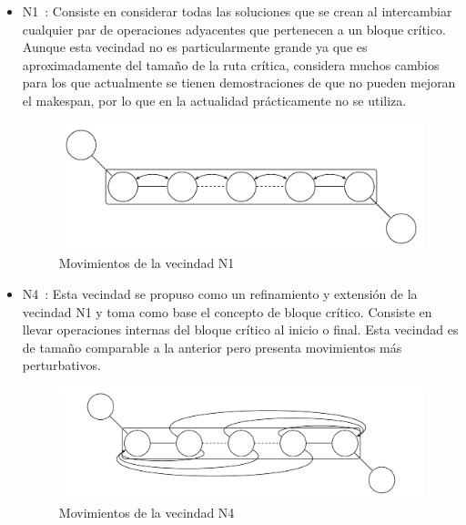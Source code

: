 \begin{itemize}
\item N1~\cite{blazewicz1996job}: Consiste en considerar todas las soluciones que se crean al intercambiar cualquier par de operaciones adyacentes que pertenecen 
a un bloque crítico. Aunque esta vecindad no es particularmente grande ya que es aproximadamente del tamaño de la ruta crítica, considera muchos cambios para los que 
actualmente se tienen demostraciones de que no pueden mejoran el makespan, por lo que en la actualidad prácticamente no se utiliza.
\begin{figure}[H]
\centering
\includegraphics[scale=.7]{Imagenes/N1.pdf}
\caption{Movimientos de la vecindad N1}
\end{figure}

\item N4~\cite{dell1993applying}: Esta vecindad se propuso como un refinamiento y extensión de la vecindad N1 y toma como base el concepto de bloque crítico. 
%
Consiste en llevar operaciones internas del bloque crítico al inicio o final. 
%
Esta vecindad es de tamaño comparable a la anterior pero presenta movimientos más perturbativos.
\begin{figure}[H]
\centering
\includegraphics[scale=.7]{Imagenes/N4.pdf}
\caption{Movimientos de la vecindad N4}
\end{figure}



\end{itemize}
